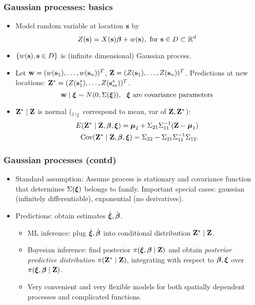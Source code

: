 \documentclass{beamer}
\begin{document}
\begin{frame}
\frametitle{Gaussian processes: basics   }
\begin{itemize}
\item Model random variable at location ${\bf s}$ by
 $$ Z({\bf s}) = X({\bf s}) \mbox{\boldmath $\beta$} + w({\bf s}), \mbox{  for }{\bf s} \in D \subset {\mathbb R}^d $$
\item $\{ w({\bf s}), {\bf s} \in D \}$ is (infinite dimensional) Gaussian process.
\item Let ${\bf w}=(w({\bf s}_1),\dots,w({\bf s}_n))^T$, ${\bf Z}=(Z({\bf s}_1),\dots,Z({\bf s}_n))^T$. Predictions at new locations: ${\bf Z}^*=(Z({\bf s}_1^*),\dots,Z({\bf s}_m^*))^T$.
  $${\bf w} \mid \mbox{\boldmath $\xi$} \sim N(0,\Sigma(\mbox{\boldmath $\xi$})), ~~ \mbox{$\mbox{\boldmath $\xi$}$ are covariance parameters}$$
\item ${\bf Z}^* \mid {\bf Z}$ is normal ($_1,_2$ correspond to mean, var of 
  ${\bf Z},{\bf Z}^*$): 
\begin{equation*}\label{eq:condtlref}
\begin{split}
 E({\bf Z}^* \mid {\bf Z}, \mbox{\boldmath $\beta$},\mbox{\boldmath $\xi$})
 =\mbox{\boldmath $\mu$}_2 + \Sigma_{21} \Sigma_{11}^{-1} ({\bf Z}-\mbox{\boldmath $\mu$}_1)  \\
 \mbox{Cov}({\bf Z}^* \mid {\bf Z}, \mbox{\boldmath $\beta$},\mbox{\boldmath $\xi$})=\Sigma_{22} - \Sigma_{21} \Sigma_{11}^{-1} \Sigma_{12}.
  \end{split}
\end{equation*}
\end{itemize}
\end{frame}

\begin{frame}
\frametitle{Gaussian processes (contd)   }
\begin{itemize}
\item Standard assumption: Assume process is stationary and covariance function that determines
  $\Sigma(\mbox{\boldmath $\xi$})$ belongs to \Matern family. Important special cases:
  gaussian (infinitely differentiable), exponential (no derivatives).
\item Predictions: obtain estimates $\hat{\mbox{\boldmath $\xi$}},\hat{\mbox{\boldmath $\beta$}} $.
\begin{itemize}
\item ML inference: plug $\hat{\mbox{\boldmath $\xi$}},\hat{\mbox{\boldmath $\beta$}} $ into conditional distribution ${\bf Z}^* \mid {\bf Z}$.
\item Bayesian inference: find posterior
  $\pi(\mbox{\boldmath $\xi$},\mbox{\boldmath $\beta$}\mid {\bf Z})$ and obtain {\it posterior
    predictive distribution} $\pi({\bf Z}^* \mid {\bf Z})$, integrating with
  respect to $\mbox{\boldmath $\beta$},\mbox{\boldmath $\xi$}$ over 
  $\pi(\mbox{\boldmath $\xi$},\mbox{\boldmath $\beta$}\mid {\bf Z})$.
\item Very convenient and very flexible models for both spatially dependent processes and complicated functions.
\end{itemize}
\end{itemize}
\end{frame}
\end{document}
